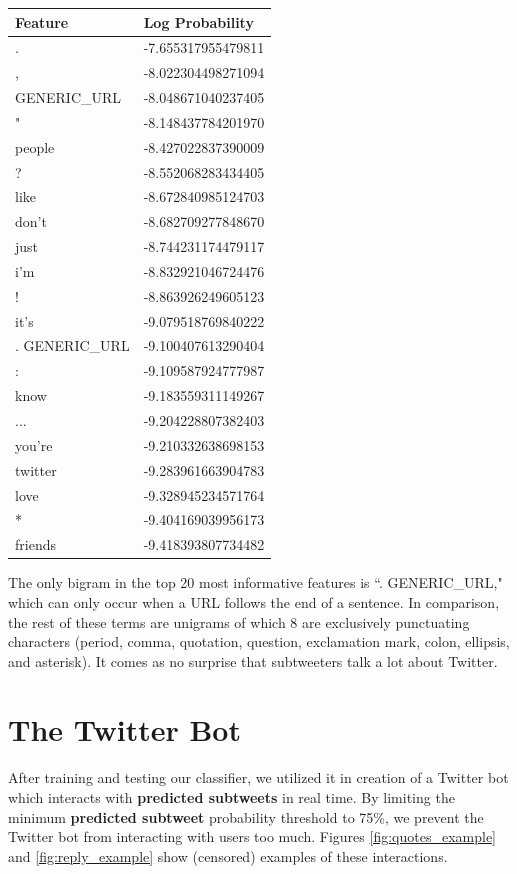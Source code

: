 \documentclass[11pt, twoside, reqno]{book}
\begin{document}
\begin{center}
\begin{tabular}{ | p{8em} | p{9em} | }
\hline
Feature & Log Probability    \\ \hline
.       & -7.655317955479811 \\
,       & -8.022304498271094 \\
GENERIC\_URL& -8.048671040237405 \\
"       & -8.148437784201970 \\
people  & -8.427022837390009 \\
?       & -8.552068283434405 \\
like    & -8.672840985124703 \\
don't   & -8.682709277848670 \\
just    & -8.744231174479117 \\
i'm     & -8.832921046724476 \\
!       & -8.863926249605123 \\
it's    & -9.079518769840222 \\
. GENERIC\_URL   & -9.100407613290404 \\
:       & -9.109587924777987 \\
know    & -9.183559311149267 \\
...     & -9.204228807382403 \\
you're  & -9.210332638698153 \\
twitter & -9.283961663904783 \\
love    & -9.328945234571764 \\
*       & -9.404169039956173 \\
friends & -9.418393807734482 \\
\hline
\end{tabular}
\end{center}

\noindent
The only bigram in the top 20 most informative features is ``. GENERIC\_URL," which can only occur when a URL follows the end of a sentence. In comparison, the rest of these terms are unigrams of which 8 are exclusively punctuating characters (period, comma, quotation, question, exclamation mark, colon, ellipsis, and asterisk). It comes as no surprise that subtweeters talk a lot about Twitter.

\section{The Twitter Bot}
\label{the_twitter_bot}

After training and testing our classifier, we utilized it in creation of a Twitter bot which interacts with \textbf{predicted subtweets} in real time. By limiting the minimum \textbf{predicted subtweet} probability threshold to 75\%, we prevent the Twitter bot from interacting with users too much. Figures \ref{fig:quotes_example} and \ref{fig:reply_example} show (censored) examples of these interactions.
\end{document}
